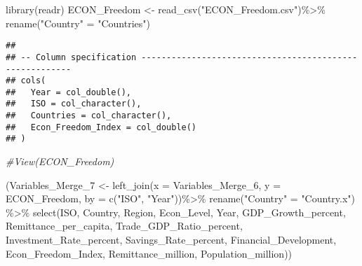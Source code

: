 \documentclass[
]{article}
\newenvironment{Shaded}{\begin{snugshade}}{\end{snugshade}}
\newcommand{\AttributeTok}[1]{\textcolor[rgb]{0.77,0.63,0.00}{#1}}
\newcommand{\CommentTok}[1]{\textcolor[rgb]{0.56,0.35,0.01}{\textit{#1}}}
\newcommand{\FunctionTok}[1]{\textcolor[rgb]{0.00,0.00,0.00}{#1}}
\newcommand{\NormalTok}[1]{#1}
\newcommand{\OtherTok}[1]{\textcolor[rgb]{0.56,0.35,0.01}{#1}}
\newcommand{\SpecialCharTok}[1]{\textcolor[rgb]{0.00,0.00,0.00}{#1}}
\newcommand{\StringTok}[1]{\textcolor[rgb]{0.31,0.60,0.02}{#1}}
\begin{document}
\begin{Shaded}
\begin{Highlighting}[]
\FunctionTok{library}\NormalTok{(readr)}
\NormalTok{ECON\_Freedom }\OtherTok{\textless{}{-}} \FunctionTok{read\_csv}\NormalTok{(}\StringTok{"ECON\_Freedom.csv"}\NormalTok{)}\SpecialCharTok{\%\textgreater{}\%}
  \FunctionTok{rename}\NormalTok{(}\StringTok{"Country"} \OtherTok{=} \StringTok{"Countries"}\NormalTok{)}
\end{Highlighting}
\end{Shaded}

\begin{verbatim}
## 
## -- Column specification --------------------------------------------------------
## cols(
##   Year = col_double(),
##   ISO = col_character(),
##   Countries = col_character(),
##   Econ_Freedom_Index = col_double()
## )
\end{verbatim}

\begin{Shaded}
\begin{Highlighting}[]
\CommentTok{\#View(ECON\_Freedom)}


\NormalTok{(Variables\_Merge\_7 }\OtherTok{\textless{}{-}} \FunctionTok{left\_join}\NormalTok{(}\AttributeTok{x =}\NormalTok{ Variables\_Merge\_6, }\AttributeTok{y =}\NormalTok{ ECON\_Freedom, }\AttributeTok{by =} \FunctionTok{c}\NormalTok{(}\StringTok{"ISO"}\NormalTok{, }\StringTok{"Year"}\NormalTok{))}\SpecialCharTok{\%\textgreater{}\%}
  \FunctionTok{rename}\NormalTok{(}\StringTok{"Country"} \OtherTok{=} \StringTok{"Country.x"}\NormalTok{) }\SpecialCharTok{\%\textgreater{}\%}
  \FunctionTok{select}\NormalTok{(ISO, Country, Region, Econ\_Level, Year, GDP\_Growth\_percent, Remittance\_per\_capita, Trade\_GDP\_Ratio\_percent, Investment\_Rate\_percent, Savings\_Rate\_percent, Financial\_Development, Econ\_Freedom\_Index, Remittance\_million, Population\_million))}
\end{Highlighting}
\end{Shaded}
\end{document}
